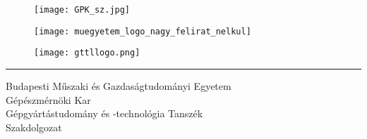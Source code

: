 \begin{titlepage}
	\begin{figure}[h]
		\centering
		\begin{minipage}[h]{0.15\textwidth}
			\centering
			\texttt{[image: GPK\_sz.jpg]}
		\end{minipage}
		\quad %
		\begin{minipage}[h]{0.6\textwidth}
			\centering
			\texttt{[image: muegyetem\_logo\_nagy\_felirat\_nelkul]}
		\end{minipage}
		\quad %
		\begin{minipage}[h]{0.15\textwidth}
			\centering
			\texttt{[image: gttllogo.png]}
		\end{minipage}
	\end{figure}
	\hrule
	\vspace{1em}
	{\large Budapesti Műszaki és Gazdaságtudományi Egyetem}\\[0.2em]%
	{\large Gépészmérnöki Kar}\\[0.2em] %
	{\large Gépgyártástudomány és -technológia Tanszék}\\[0.2em] %
	{\large Szakdolgozat}  %
	
	\vspace{15em}
	

\end{titlepage}
